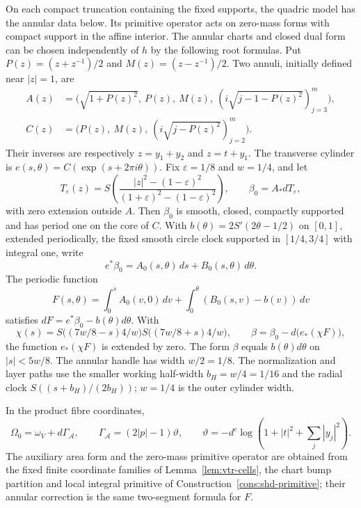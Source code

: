 \begin{proposition}\label{prop:vtr-handle}
On each compact truncation containing the fixed supports, the quadric model has the annular data below. Its primitive operator acts on zero-mass forms with compact support in the affine interior. The annular charts and closed dual form can be
chosen independently of $h$ by the following root formulas.
Put $P(z)=(z+z^{-1})/2$ and $M(z)=(z-z^{-1})/2$. Two annuli, initially defined near $|z|=1$, are
\[
 \begin{split}
 A(z)&=\bigl(\sqrt{1+P(z)^2},\ P(z),\ M(z),\ (i\sqrt{j-1-P(z)^2})_{j=3}^m\bigr),\\
 C(z)&=\bigl(P(z),\ M(z),\ (i\sqrt{j-P(z)^2})_{j=2}^m\bigr).
 \end{split}
\]
Their inverses are respectively $z=y_1+y_2$ and $z=t+y_1$. The transverse cylinder is
$e(s,\theta)=C(\exp(s+2\pi i\theta))$.
Fix $\varepsilon=1/8$ and $w=1/4$, and let
\[
 T_\varepsilon(z)=S\!\left(\frac{|z|^2-(1-\varepsilon)^2}{(1+\varepsilon)^2-(1-\varepsilon)^2}\right),
 \qquad \beta_0=A_*dT_\varepsilon,
\]
with zero extension outside $A$. Then $\beta_0$ is smooth, closed, compactly supported and has period one on the core
of $C$. With $b(\theta)=2S'(2\theta-1/2)$ on $[0,1]$, extended periodically, the fixed smooth circle clock supported in
$[1/4,3/4]$ with integral one, write
\[
 e^*\beta_0=A_0(s,\theta)\,ds+B_0(s,\theta)\,d\theta.
\]
The periodic function
\[
 F(s,\theta)=\int_0^s A_0(v,0)\,dv+\int_0^\theta(B_0(s,v)-b(v))\,dv
\]
satisfies $dF=e^*\beta_0-b(\theta)d\theta$. With
\[
 \chi(s)=S\bigl((7w/8-s)4/w\bigr)S\bigl((7w/8+s)4/w\bigr),\qquad
 \beta=\beta_0-d\bigl(e_*(\chi F)\bigr),
\]
the function $e_*(\chi F)$ is extended by zero. The form $\beta$ equals $b(\theta)d\theta$ on $|s|<5w/8$.
The annular handle has width $w/2=1/8$. The normalization and layer paths use the smaller working half-width
$b_H=w/4=1/16$ and the radial clock $S((s+b_H)/(2b_H))$; $w=1/4$ is the outer cylinder width.

In the product fibre coordinates,
\[
 \Omega_0=\omega_V+d\Gamma_{\mathcal A},\qquad
 \Gamma_{\mathcal A}=(2|p|-1)\vartheta,\qquad
 \vartheta=-d^c\log(1+|t|^2+\textstyle\sum_j|y_j|^2).
\]
The auxiliary area form and the zero-mass primitive operator are obtained from the fixed finite coordinate families
of Lemma~\ref{lem:vtr-cells}, the chart bump partition and local integral primitive of
Construction~\ref{cons:shd-primitive}; their annular correction is the same two-segment formula for $F$.
\end{proposition}

